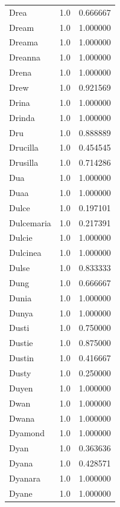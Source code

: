 \documentclass[
  letterpaper,
  DIV=11,
  numbers=noendperiod]{scrreprt}
\begin{document}
\begin{tabular}{lrr}
Drea            &   1.0 &   0.666667 \\
Dream           &   1.0 &   1.000000 \\
Dreama          &   1.0 &   1.000000 \\
Dreanna         &   1.0 &   1.000000 \\
Drena           &   1.0 &   1.000000 \\
Drew            &   1.0 &   0.921569 \\
Drina           &   1.0 &   1.000000 \\
Drinda          &   1.0 &   1.000000 \\
Dru             &   1.0 &   0.888889 \\
Drucilla        &   1.0 &   0.454545 \\
Drusilla        &   1.0 &   0.714286 \\
Dua             &   1.0 &   1.000000 \\
Duaa            &   1.0 &   1.000000 \\
Dulce           &   1.0 &   0.197101 \\
Dulcemaria      &   1.0 &   0.217391 \\
Dulcie          &   1.0 &   1.000000 \\
Dulcinea        &   1.0 &   1.000000 \\
Dulse           &   1.0 &   0.833333 \\
Dung            &   1.0 &   0.666667 \\
Dunia           &   1.0 &   1.000000 \\
Dunya           &   1.0 &   1.000000 \\
Dusti           &   1.0 &   0.750000 \\
Dustie          &   1.0 &   0.875000 \\
Dustin          &   1.0 &   0.416667 \\
Dusty           &   1.0 &   0.250000 \\
Duyen           &   1.0 &   1.000000 \\
Dwan            &   1.0 &   1.000000 \\
Dwana           &   1.0 &   1.000000 \\
Dyamond         &   1.0 &   1.000000 \\
Dyan            &   1.0 &   0.363636 \\
Dyana           &   1.0 &   0.428571 \\
Dyanara         &   1.0 &   1.000000 \\
Dyane           &   1.0 &   1.000000 \\

\end{tabular}
\end{document}
